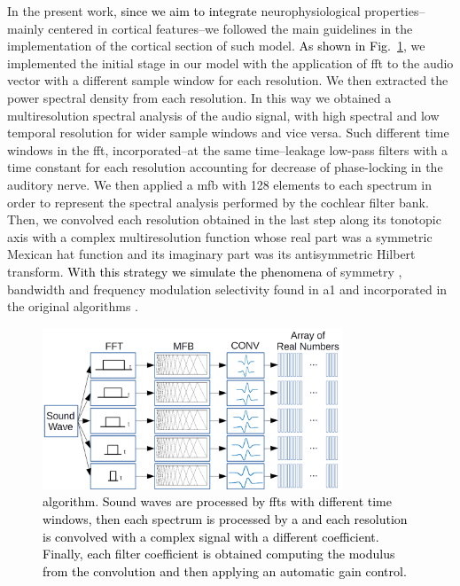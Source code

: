 \documentclass[10pt,letterpaper]{article}
\newcommand{\reviewertwo}[1]{\textcolor{black}{#1}}
\newcommand{\reviewerfour}[1]{\textcolor{black}{#1}}
\begin{document}
In the present work, \reviewertwo{since we aim to integrate} neurophysiological
properties--mainly centered in cortical features--we followed the main guidelines in the implementation of the cortical section of such model. 
\reviewerfour{As shown in Fig.~\ref{fig:MRSTSA}}, we implemented the initial stage in our model with the application of \gls{fft} to the audio vector
with a different sample window for each resolution.
We then extracted the power spectral density from each resolution.
In this way we obtained a multiresolution spectral analysis of the audio signal,
with high spectral and low temporal resolution for wider sample windows and
vice versa.
Such different time windows in the \gls{fft},
incorporated--at the same time--leakage low-pass filters with a time constant for each
resolution accounting for decrease of phase-locking in the auditory nerve.
We then applied a \gls{mfb} with 128 elements to each spectrum
in order to represent the spectral analysis performed by the cochlear filter bank.
Then, we convolved each resolution obtained in the last step along its tonotopic axis
with a complex multiresolution function whose real part
was a symmetric Mexican hat function and its imaginary part was its antisymmetric Hilbert transform.
\reviewertwo{With this strategy we simulate the phenomena} of symmetry \cite{shamma_1993}, bandwidth \cite{schreiner_1990}
and frequency modulation selectivity \cite{shamma_1993,heil_1992,mendelson_1985}
found in \gls{a1} and incorporated in the original algorithms \cite{wang_1995}.

\begin{figure}[h!]
    \centering
    \includegraphics[width=0.8\textwidth]{MRSTSA.png}
    \caption{\reviewerfour{ algorithm. Sound waves are processed by \glspl{fft} with different time windows, then each spectrum is processed by
    a \glsfirst{mfb} and each resolution is convolved with a complex signal with a different coefficient. Finally, each filter coefficient
    is obtained computing the modulus from the convolution and then applying an automatic gain control.}}
    \label{fig:MRSTSA}
\end{figure}
\end{document}
